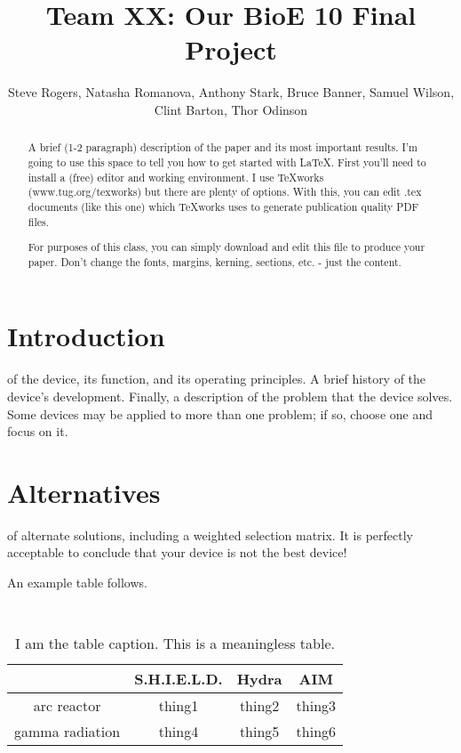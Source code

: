 \documentclass[twocolumn]{IEEEtran}
\begin{document}
\title{Team XX: Our BioE 10 Final Project}
\author{Steve Rogers, Natasha Romanova, Anthony Stark, Bruce Banner, Samuel Wilson, Clint Barton, Thor Odinson}
\maketitle


\begin{abstract}
A brief (1-2 paragraph) description of the paper and its most important results. I'm going to use this space to tell you how to get started with LaTeX. First you'll need to install a (free) editor and working environment. I use TeXworks (www.tug.org/texworks) but there are plenty of options. With this, you can edit .tex documents (like this one) which TeXworks uses to generate publication quality PDF files. 

For purposes of this class, you can simply download and edit this file to produce your paper. Don't change the fonts, margins, kerning, sections, etc. - just the content.
\end{abstract}

\section{Introduction}
 of the device, its function, and its operating principles. A brief history of the device’s development. Finally, a description of the problem that the device solves. Some devices may be applied to more than one problem; if so, choose one and focus on it.

\section{Alternatives}
 of alternate solutions, including a weighted selection matrix. It is perfectly acceptable to conclude that your device is not the best device!

An example table follows.

\begin{table}[h]
\caption{I am the table caption. This is a meaningless table.}
\begin{center}
{\tt
\begin{tabular}{c|c|c|c|}
&S.H.I.E.L.D.&Hydra&AIM\\\hline
arc reactor&thing1&thing2&thing3\\\hline
gamma radiation&thing4&thing5&thing6\\\hline
\end{tabular}
}
\end{center}
\end{table}
\end{document}
